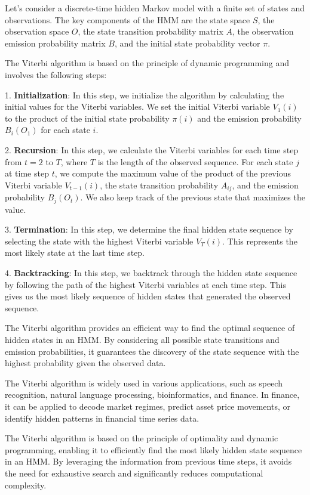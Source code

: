 \documentclass[a4paper,11pt]{article}
\begin{document}
Let's consider a discrete-time hidden Markov model with a finite set of states and observations. The key components of the HMM are the state space $S$, the observation space $O$, the state transition probability matrix $A$, the observation emission probability matrix $B$, and the initial state probability vector $\pi$.

The Viterbi algorithm is based on the principle of dynamic programming and involves the following steps:

1. \textbf{Initialization}: In this step, we initialize the algorithm by calculating the initial values for the Viterbi variables. We set the initial Viterbi variable $V_{1}(i)$ to the product of the initial state probability $\pi(i)$ and the emission probability $B_{i}(O_1)$ for each state $i$.

2. \textbf{Recursion}: In this step, we calculate the Viterbi variables for each time step from $t = 2$ to $T$, where $T$ is the length of the observed sequence. For each state $j$ at time step $t$, we compute the maximum value of the product of the previous Viterbi variable $V_{t-1}(i)$, the state transition probability $A_{ij}$, and the emission probability $B_{j}(O_t)$. We also keep track of the previous state that maximizes the value.

3. \textbf{Termination}: In this step, we determine the final hidden state sequence by selecting the state with the highest Viterbi variable $V_{T}(i)$. This represents the most likely state at the last time step.

4. \textbf{Backtracking}: In this step, we backtrack through the hidden state sequence by following the path of the highest Viterbi variables at each time step. This gives us the most likely sequence of hidden states that generated the observed sequence.

The Viterbi algorithm provides an efficient way to find the optimal sequence of hidden states in an HMM. By considering all possible state transitions and emission probabilities, it guarantees the discovery of the state sequence with the highest probability given the observed data.

The Viterbi algorithm is widely used in various applications, such as speech recognition, natural language processing, bioinformatics, and finance. In finance, it can be applied to decode market regimes, predict asset price movements, or identify hidden patterns in financial time series data.

The Viterbi algorithm is based on the principle of optimality and dynamic programming, enabling it to efficiently find the most likely hidden state sequence in an HMM. By leveraging the information from previous time steps, it avoids the need for exhaustive search and significantly reduces computational complexity.
\end{document}
